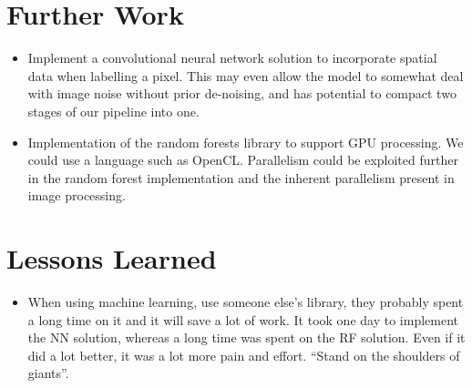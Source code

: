 \documentclass[12pt,twoside,notitlepage]{report}
\begin{document}
    \section{Further Work}
        \begin{itemize}
            \item   
                Implement a convolutional neural network solution to incorporate spatial data when labelling a pixel. This may even allow the model to somewhat deal with image noise without prior de-noising, and has potential to compact two stages of our pipeline into one.
            \item 
                Implementation of the random forests library to support GPU processing. We could use a language such as OpenCL. Parallelism could be exploited further in the random forest implementation and the inherent parallelism present in image processing.
        \end{itemize}

    \section{Lessons Learned}
        \begin{itemize}
            \item When using machine learning, use someone else's library, they probably spent a long time on it
                and it will save a lot of work. It took one day to implement the NN solution, whereas a long time 
                was spent on the RF solution. Even if it did a lot better, it was a lot more pain and effort. 
                ``Stand on the shoulders of giants''.
        \end{itemize}











\cleardoublepage
{}

\cleardoublepage
\end{document}

